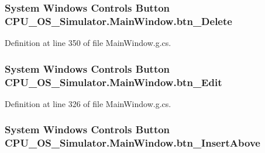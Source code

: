 \subsubsection[{btn\+\_\+\+Delete}]{\setlength{\rightskip}{0pt plus 5cm}System Windows Controls Button C\+P\+U\+\_\+\+O\+S\+\_\+\+Simulator.\+Main\+Window.\+btn\+\_\+\+Delete\hspace{0.3cm}{\ttfamily [package]}}\label{class_c_p_u___o_s___simulator_1_1_main_window_a74623b1e8f8ab1b3b6835bda2e8a9256}


Definition at line 350 of file Main\+Window.\+g.\+cs.

\hypertarget{class_c_p_u___o_s___simulator_1_1_main_window_ae07013ea273fb1e9f38fd1dd83144371}{}
\subsubsection[{btn\+\_\+\+Edit}]{\setlength{\rightskip}{0pt plus 5cm}System Windows Controls Button C\+P\+U\+\_\+\+O\+S\+\_\+\+Simulator.\+Main\+Window.\+btn\+\_\+\+Edit\hspace{0.3cm}{\ttfamily [package]}}\label{class_c_p_u___o_s___simulator_1_1_main_window_ae07013ea273fb1e9f38fd1dd83144371}


Definition at line 326 of file Main\+Window.\+g.\+cs.

\hypertarget{class_c_p_u___o_s___simulator_1_1_main_window_a23c681375b103d2294ac79c51f1fb406}{}
\subsubsection[{btn\+\_\+\+Insert\+Above}]{\setlength{\rightskip}{0pt plus 5cm}System Windows Controls Button C\+P\+U\+\_\+\+O\+S\+\_\+\+Simulator.\+Main\+Window.\+btn\+\_\+\+Insert\+Above\hspace{0.3cm}{\ttfamily [package]}}\label{class_c_p_u___o_s___simulator_1_1_main_window_a23c681375b103d2294ac79c51f1fb406}


